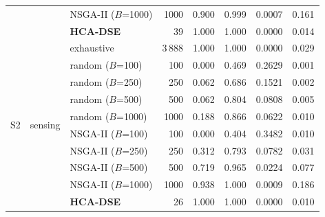 \documentclass[preprint,11pt,3p]{elsarticle}
\begin{document}
\begin{table}[!htbp]
\begin{tabular}{lllrrrrr}
 & & NSGA-II ($B$=1000) & 1000 & 0.900 & 0.999 & 0.0007 & 0.161 \\
 & & \textbf{HCA-DSE} & 39 & 1.000 & 1.000 & 0.0000 & 0.014 \\
\midrule
\multirow{10}{*}{S2} & \multirow{10}{*}{sensing} & exhaustive & 3\,888 & 1.000 & 1.000 & 0.0000 & 0.029 \\
 & & random ($B$=100) & 100 & 0.000 & 0.469 & 0.2629 & 0.001 \\
 & & random ($B$=250) & 250 & 0.062 & 0.686 & 0.1521 & 0.002 \\
 & & random ($B$=500) & 500 & 0.062 & 0.804 & 0.0808 & 0.005 \\
 & & random ($B$=1000) & 1000 & 0.188 & 0.866 & 0.0622 & 0.010 \\
 & & NSGA-II ($B$=100) & 100 & 0.000 & 0.404 & 0.3482 & 0.010 \\
 & & NSGA-II ($B$=250) & 250 & 0.312 & 0.793 & 0.0782 & 0.031 \\
 & & NSGA-II ($B$=500) & 500 & 0.719 & 0.965 & 0.0224 & 0.077 \\
 & & NSGA-II ($B$=1000) & 1000 & 0.938 & 1.000 & 0.0009 & 0.186 \\
 & & \textbf{HCA-DSE} & 26 & 1.000 & 1.000 & 0.0000 & 0.010 \\
\midrule
\bottomrule
\end{tabular}
\end{table}
\clearpage
\end{document}
